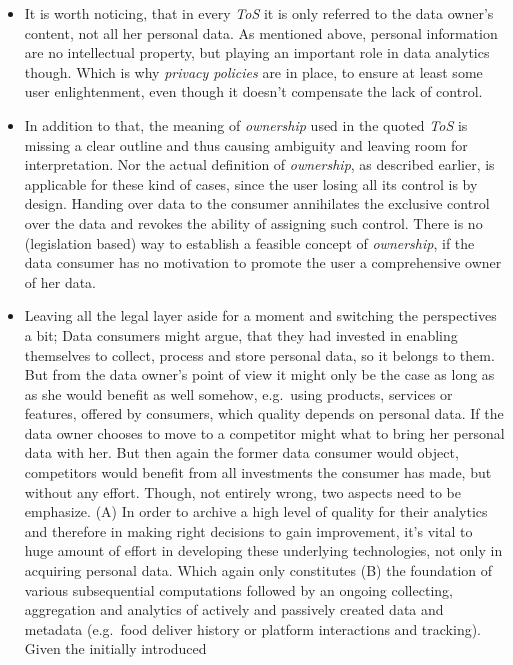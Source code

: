 \documentclass[12pt,english,a4paper,titlepage,cleardoublepage=empty,dottedtoc]{report}
\begin{document}
\begin{itemize}
\item
  It is worth noticing, that in every \emph{ToS} it is only referred to
  the data owner's content, not all her personal data. As mentioned
  above, personal information are no intellectual property, but playing
  an important role in data analytics though. Which is why \emph{privacy
  policies} are in place, to ensure at least some user enlightenment,
  even though it doesn't compensate the lack of control.
\item
  In addition to that, the meaning of \emph{ownership} used in the
  quoted \emph{ToS} is missing a clear outline and thus causing
  ambiguity and leaving room for interpretation. Nor the actual
  definition of \emph{ownership}, as described earlier, is applicable
  for these kind of cases, since the user losing all its control is by
  design. Handing over data to the consumer annihilates the exclusive
  control over the data and revokes the ability of assigning such
  control. There is no (legislation based) way to establish a feasible
  concept of \emph{ownership}, if the data consumer has no motivation to
  promote the user a comprehensive owner of her data.
\item
  Leaving all the legal layer aside for a moment and switching the
  perspectives a bit; Data consumers might argue, that they had invested
  in enabling themselves to collect, process and store personal data, so
  it belongs to them. But from the data owner's point of view it might
  only be the case as long as as she would benefit as well somehow,
  e.g.~using products, services or features, offered by consumers, which
  quality depends on personal data. If the data owner chooses to move to
  a competitor might what to bring her personal data with her. But then
  again the former data consumer would object, competitors would benefit
  from all investments the consumer has made, but without any effort.
  Though, not entirely wrong, two aspects need to be emphasize. (A) In
  order to archive a high level of quality for their analytics and
  therefore in making right decisions to gain improvement, it's vital to
  huge amount of effort in developing these underlying technologies, not
  only in acquiring personal data. Which again only constitutes (B) the
  foundation of various subsequential computations followed by an
  ongoing collecting, aggregation and analytics of actively and
  passively created data and metadata (e.g.~food deliver history or
  platform interactions and tracking). Given the initially introduced

\end{itemize}
\end{document}
